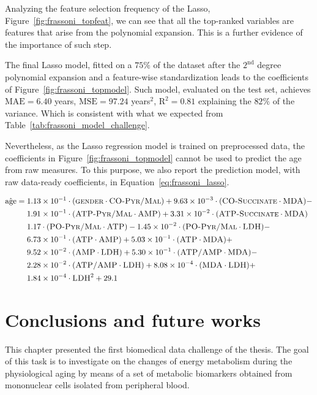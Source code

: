 Analyzing the feature selection frequency of the Lasso, Figure~\ref{fig:frassoni_topfeat}, we can see that all the top-ranked variables are features that arise from the polynomial expansion. This is a further evidence of the importance of such step.

The final Lasso model, fitted on a $75\%$ of the dataset after the $2^{\text{nd}}$ degree polynomial expansion and a feature-wise standardization leads to the coefficients of Figure~\ref{fig:frassoni_topmodel}. Such model, evaluated on the test set, achieves $\text{MAE}=6.40$ years, $\text{MSE} = 97.24$ years$^2$, $\text{R}^2 = 0.81$ explaining the $82\%$ of the variance. Which is consistent with what we expected from Table~\ref{tab:frassoni_model_challenge}.

Nevertheless, as the Lasso regression model is trained on preprocessed data, the coefficients in Figure~\ref{fig:frassoni_topmodel} cannot be used to predict the age from raw measures. To this purpose, we also report the prediction model, with raw data-ready coefficients, in Equation~\eqref{eq:frassoni_lasso}.

\begin{equation}\label{eq:frassoni_lasso}
\begin{aligned}
\hat{\text{age}} = {} & 1.13 \times 10^{-1} \cdot (\text{\gender} \cdot \text{\copyrmal}) +
9.63 \times 10^{-3} \cdot (\text{\cosucc} \cdot \text{\mda}) - \\
& 1.91 \times 10^{-1} \cdot (\text{\atppyrmal} \cdot \text{\amp}) +
3.31 \times 10^{-2} \cdot (\text{\atpsucc} \cdot \text{\mda}) \\
& 1.17 \cdot (\text{\popyrmal} \cdot \text{\atp}) -
1.45 \times 10^{-2} \cdot (\text{\popyrmal} \cdot \text{\ldh}) -\\
& 6.73 \times 10^{-1} \cdot (\text{\atp} \cdot \text{\amp}) +
5.03 \times 10^{-1} \cdot (\text{\atp} \cdot \text{\mda}) +\\
& 9.52 \times 10^{-2} \cdot (\text{\amp} \cdot \text{\ldh}) +
5.30 \times 10^{-1} \cdot (\text{\atpamp} \cdot \text{\mda}) -\\
& 2.28 \times 10^{-2} \cdot (\text{\atpamp} \cdot \text{\ldh}) +
8.08 \times 10^{-4} \cdot (\text{\mda} \cdot \text{\ldh}) +\\
& 1.84 \times 10^{-4} \cdot \text{\ldh}^2 +
29.1
\end{aligned}
\end{equation}



\section{Conclusions and future works} \label{sec:frassoni_conclusions}
This chapter presented the first biomedical data challenge of the thesis. The goal of this task is to investigate on the changes of energy metabolism during the physiological aging by means of a set of metabolic biomarkers obtained from mononuclear cells isolated from peripheral blood.

